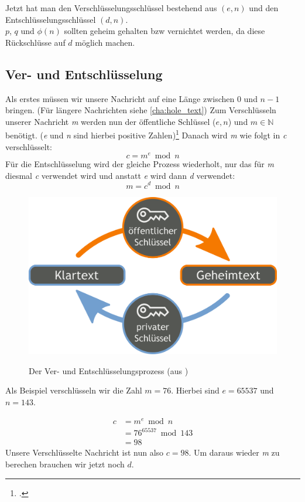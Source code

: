 \documentclass[12pt,a4paper]{scrartcl}
\begin{document}
Jetzt hat man den Verschlüsselungsschlüssel bestehend aus $(e, n)$ und den Entschlüsselungsschlüssel $(d, n)$. \\
$p$, $q$ und $\phi(n)$ sollten geheim gehalten bzw vernichtet werden, da diese Rückschlüsse auf $d$ möglich machen.
	
	\subsection{Ver- und Entschlüsselung}
	Als erstes müssen wir unsere Nachricht auf eine Länge zwischen 0 und $n-1$ bringen. (Für längere Nachrichten siehe \ref{cha:hole_text})
	Zum Verschlüsseln unserer Nachricht \textit{m} werden nun der öffentliche Schlüssel ($e, n$) und $m \in \mathbb{N}$ benötigt. (\textit{e} und \textit{n} sind hierbei positive Zahlen)\footcite[][6]{rsaOriginalPaper} Danach wird \textit{m} wie folgt in \textit{c} verschlüsselt: 
	$$c = m^e \bmod n$$
	Für die Entschlüsselung wird der gleiche Prozess wiederholt, nur das für \textit{m} diesmal \textit{c} verwendet wird und anstatt \textit{e} wird dann \textit{d} verwendet:
	$$m = c^d \bmod n$$
	
	\begin{figure}
	\includegraphics[scale=0.05]{Orange_blue_public_key_cryptography_de.svg.png} \\
	\caption{Der Ver- und Entschlüsselungsprozess (aus \cite{wikipedia})}
	\label{fig:figure1}
	\end{figure}
	
	Als Beispiel verschlüsseln wir die Zahl $m = 76$. Hierbei sind $e=65537$ und $n=143$.

	\begin{equation}
	\begin{split}
	c & = m^e \bmod n \\
	 &  = 76^{65537} \bmod 143 \\
 	& = 98
	\end{split}
	\end{equation}
	Unsere Verschlüsselte Nachricht ist nun also $c = 98$. Um daraus wieder \textit{m} zu berechen brauchen wir jetzt noch $d$.
\end{document}
